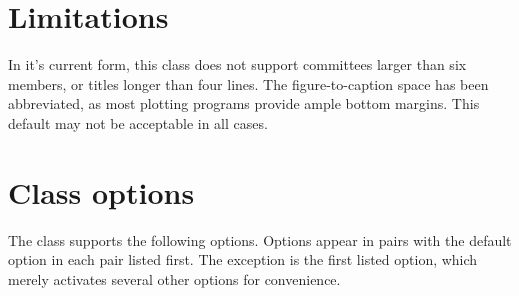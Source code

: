 \section{Limitations}
In it's current form, this class does not support committees larger than
six members, or titles longer than four
lines.  The
figure-to-caption space has been abbreviated, as most plotting programs
provide ample bottom margins.  This default may not be acceptable in all
cases.

\section{Class options}

The class supports the following options.  Options appear in pairs with the
default option in each pair listed first.  The exception is the first listed
option, which merely activates several other options for convenience.
